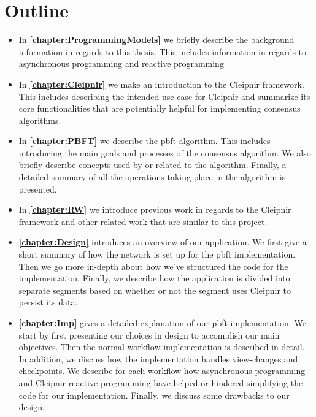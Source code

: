 \section{Outline}
\begin{itemize}
\item In \textbf{\autoref{chapter:ProgrammingModels}} we briefly describe the background information in regards to this thesis. This includes information in regards to asynchronous programming and reactive programming

\item In \textbf{\autoref{chapter:Cleipnir}} we make an introduction to the Cleipnir framework. This includes describing the intended use-case for Cleipnir and summarize its core functionalities that are potentially helpful for implementing consensus algorithms.

\item In \textbf{\autoref{chapter:PBFT}} we describe the \ac{pbft} algorithm. This includes introducing the main goals and processes of the consensus algorithm. We also briefly describe concepts used by or related to the algorithm. Finally, a detailed summary of all the operations taking place in the algorithm is presented.

\item In \textbf{\autoref{chapter:RW}} we introduce previous work in regards to the Cleipnir framework and other related work that are similar to this project.

\item \textbf{\autoref{chapter:Design}} introduces an overview of our application. We first give a short summary of how the network is set up for the \ac{pbft} implementation. Then we go more in-depth about how we’ve structured the code for the implementation. Finally, we describe how the application is divided into separate segments based on whether or not the segment uses Cleipnir to persist its data.

\item \textbf{\autoref{chapter:Imp}} gives a detailed explanation of our \ac{pbft} implementation. We start by first presenting our choices in design to accomplish our main objectives. Then the normal workflow implementation is described in detail. In addition, we discuss how the implementation handles view-changes and checkpoints. We describe for each workflow how asynchronous programming and Cleipnir reactive programming have helped or hindered simplifying the code for our implementation. Finally, we discuss some drawbacks to our design.


\end{itemize}
